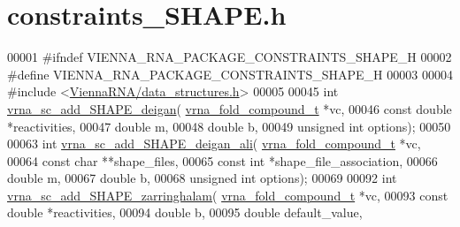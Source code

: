 \hypertarget{constraints__SHAPE_8h_source}{}\section{constraints\+\_\+\+S\+H\+A\+P\+E.\+h}
\label{constraints__SHAPE_8h_source}

\begin{DoxyCode}
00001 \textcolor{preprocessor}{#ifndef VIENNA\_RNA\_PACKAGE\_CONSTRAINTS\_SHAPE\_H}
00002 \textcolor{preprocessor}{#define VIENNA\_RNA\_PACKAGE\_CONSTRAINTS\_SHAPE\_H}
00003 
00004 \textcolor{preprocessor}{#include <\hyperlink{data__structures_8h}{ViennaRNA/data\_structures.h}>}
00005 
00045 \textcolor{keywordtype}{int} \hyperlink{group__SHAPE__reactivities_ga57d612b58e1c61dd6cfcb5a843f8f1b3}{vrna\_sc\_add\_SHAPE\_deigan}( \hyperlink{group__fold__compound_structvrna__fc__s}{vrna\_fold\_compound\_t} *vc,
00046                               \textcolor{keyword}{const} \textcolor{keywordtype}{double} *reactivities,
00047                               \textcolor{keywordtype}{double} m,
00048                               \textcolor{keywordtype}{double} b,
00049                               \textcolor{keywordtype}{unsigned} \textcolor{keywordtype}{int} options);
00050 
00063 \textcolor{keywordtype}{int} \hyperlink{group__SHAPE__reactivities_ga04ba85da63d8c793bb8001d1e6f800ba}{vrna\_sc\_add\_SHAPE\_deigan\_ali}( 
      \hyperlink{group__fold__compound_structvrna__fc__s}{vrna\_fold\_compound\_t} *vc,
00064                                   \textcolor{keyword}{const} \textcolor{keywordtype}{char} **shape\_files,
00065                                   \textcolor{keyword}{const} \textcolor{keywordtype}{int} *shape\_file\_association,
00066                                   \textcolor{keywordtype}{double} m,
00067                                   \textcolor{keywordtype}{double} b,
00068                                   \textcolor{keywordtype}{unsigned} \textcolor{keywordtype}{int} options);
00069 
00092 \textcolor{keywordtype}{int} \hyperlink{group__SHAPE__reactivities_gaf3c65a045060aef5c4e41693d30af58c}{vrna\_sc\_add\_SHAPE\_zarringhalam}( 
      \hyperlink{group__fold__compound_structvrna__fc__s}{vrna\_fold\_compound\_t} *vc,
00093                                     \textcolor{keyword}{const} \textcolor{keywordtype}{double} *reactivities,
00094                                     \textcolor{keywordtype}{double} b,
00095                                     \textcolor{keywordtype}{double} default\_value,

\end{DoxyCode}
